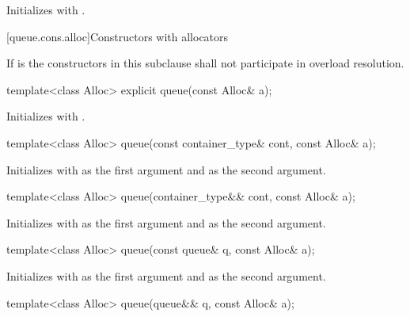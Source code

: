 \begin{itemdescr}
\pnum
\effects
Initializes  with .
\end{itemdescr}

[queue.cons.alloc]{Constructors with allocators}

\pnum
If  is 
the constructors in this subclause shall not participate in overload resolution.

%
\begin{itemdecl}
template<class Alloc> explicit queue(const Alloc& a);
\end{itemdecl}

\begin{itemdescr}
\pnum
\effects
Initializes  with .
\end{itemdescr}

%
\begin{itemdecl}
template<class Alloc> queue(const container_type& cont, const Alloc& a);
\end{itemdecl}

\begin{itemdescr}
\pnum
\effects
Initializes  with  as the first argument and 
as the second argument.
\end{itemdescr}

%
\begin{itemdecl}
template<class Alloc> queue(container_type&& cont, const Alloc& a);
\end{itemdecl}

\begin{itemdescr}
\pnum
\effects
Initializes  with  as the first argument and 
as the second argument.
\end{itemdescr}

%
\begin{itemdecl}
template<class Alloc> queue(const queue& q, const Alloc& a);
\end{itemdecl}

\begin{itemdescr}
\pnum
\effects
Initializes  with  as the first argument and  as the
second argument.
\end{itemdescr}

%
\begin{itemdecl}
template<class Alloc> queue(queue&& q, const Alloc& a);
\end{itemdecl}

